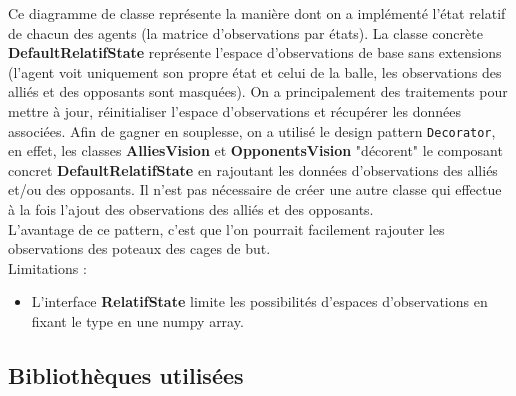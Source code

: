 \documentclass[11pt, a4paper]{article}
\begin{document}
	Ce diagramme de classe représente la manière dont on a implémenté l'état relatif de chacun des agents (la matrice d'observations par états).
	La classe concrète \textbf{DefaultRelatifState} représente l'espace d'observations de base sans extensions (l'agent voit uniquement son propre état et celui de la balle, les observations des alliés et des opposants sont masquées). On a principalement des traitements pour mettre à jour, réinitialiser l'espace d'observations et récupérer les données associées. Afin de gagner en souplesse, on a utilisé le design pattern \texttt{Decorator}, en effet, les classes \textbf{AlliesVision} et \textbf{OpponentsVision} "décorent" le composant concret \textbf{DefaultRelatifState} en rajoutant les données d'observations des alliés et/ou des opposants. Il n'est pas nécessaire de créer une autre classe qui effectue à la fois l'ajout des observations des alliés et des opposants. \\
	L'avantage de ce pattern, c'est que l'on pourrait facilement rajouter les observations des poteaux des cages de but. \\

	\noindent Limitations : \\
	\begin{itemize}
		\item L'interface \textbf{RelatifState} limite les possibilités d'espaces d'observations en fixant le type en une numpy array.
	\end{itemize}


	\subsection{Bibliothèques utilisées}
\end{document}

